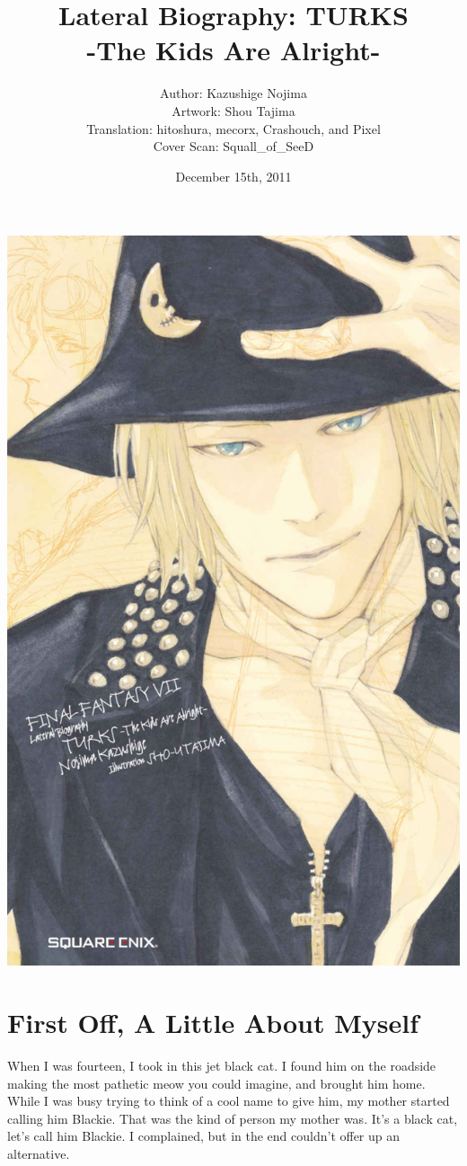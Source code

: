 \documentclass[oneside]{book}
\title{Lateral Biography: TURKS\\-The Kids Are Alright-}
\author{Author: Kazushige Nojima\\Artwork: Shou Tajima\\Translation: hitoshura, mecorx, Crashouch, and Pixel\\Cover Scan: Squall\_of\_SeeD}
\date{December 15th, 2011}
\begin{document}
\maketitle
\includegraphics[width=\textwidth,height=\textheight,keepaspectratio]{cover.png}
\tableofcontents

\chapter{First Off, A Little About Myself}
When I was fourteen, I took in this jet black cat. I found him on the roadside making the most pathetic meow you could imagine, and brought him home. While I was busy trying to think of a cool name to give him, my mother started calling him Blackie. That was the kind of person my mother was. It’s a black cat, let’s call him Blackie. I complained, but in the end couldn’t offer up an alternative.
\end{document}

